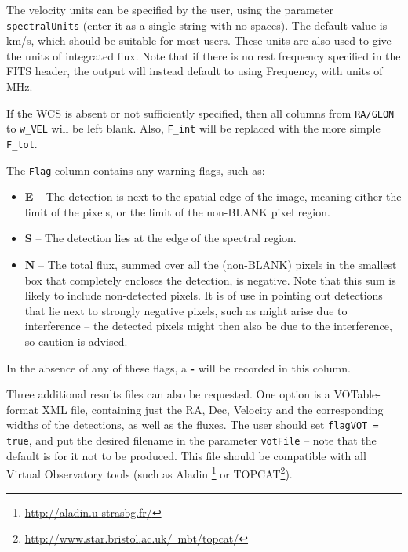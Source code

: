 The velocity units can be specified by the user, using the parameter
\texttt{spectralUnits} (enter it as a single string with no
spaces). The default value is km/s, which should be suitable for most
users. These units are also used to give the units of integrated
flux. Note that if there is no rest frequency specified in the FITS
header, the \duchamp output will instead default to using Frequency,
with units of MHz.

If the WCS is absent or not sufficiently specified, then all columns
from \texttt{RA/GLON} to \texttt{w\_VEL} will be left blank. Also,
\texttt{F\_int} will be replaced with the more simple \texttt{F\_tot}.

The \texttt{Flag} column contains any warning flags, such as:
\begin{itemize}
\item \textbf{E} -- The detection is next to the spatial edge of the image,
meaning either the limit of the pixels, or the limit of the non-BLANK
pixel region.
\item \textbf{S} -- The detection lies at the edge of the spectral region. 
\item \textbf{N} -- The total flux, summed over all the (non-BLANK)
pixels in the smallest box that completely encloses the detection, is
negative. Note that this sum is likely to include non-detected
pixels. It is of use in pointing out detections that lie next to
strongly negative pixels, such as might arise due to interference --
the detected pixels might then also be due to the interference, so
caution is advised.
\end{itemize}
In the absence of any of these flags, a \textbf{-} will be recorded in
this column.


Three additional results files can also be requested. One option is a
VOTable-format XML file, containing just the RA, Dec, Velocity and the
corresponding widths of the detections, as well as the fluxes. The
user should set \texttt{flagVOT = true}, and put the desired filename
in the parameter \texttt{votFile} -- note that the default is for it
not to be produced. This file should be compatible with all Virtual
Observatory tools (such as Aladin%
\footnote{%
\href{http://aladin.u-strasbg.fr/}{http://aladin.u-strasbg.fr/}}
or TOPCAT\footnote{%
\href{http://www.star.bristol.ac.uk/~mbt/topcat/}%
{http://www.star.bristol.ac.uk/~mbt/topcat/}}). 

